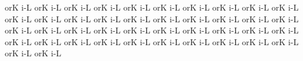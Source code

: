 


\initiumgregorianum
\spatium
{}or\punctum K\egn
\sgn {}i-\punctum L\egn
\spatium
{}or\punctum K\egn
\sgn {}i-\punctum L\egn
\spatium
{}or\punctum K\egn
\sgn {}i-\punctum L\egn
\spatium
{}or\punctum K\egn
\sgn {}i-\punctum L\egn
\spatium
{}or\punctum K\egn
\sgn {}i-\punctum L\egn
\spatium
{}or\punctum K\egn
\sgn {}i-\punctum L\egn
\spatium
{}or\punctum K\egn
\sgn {}i-\punctum L\egn
\spatium
{}or\punctum K\egn
\sgn {}i-\punctum L\egn
\spatium
{}or\punctum K\egn
\sgn {}i-\punctum L\egn
\spatium
{}or\punctum K\egn
\sgn {}i-\punctum L\egn
\spatium
{}or\punctum K\egn
\sgn {}i-\punctum L\egn
\spatium
{}or\punctum K\egn
\sgn {}i-\punctum L\egn
\spatium
{}or\punctum K\egn
\sgn {}i-\punctum L\egn
\spatium
{}or\punctum K\egn
\sgn {}i-\punctum L\egn
\spatium
{}or\punctum K\egn
\sgn {}i-\punctum L\egn
\spatium
{}or\punctum K\egn
\sgn {}i-\punctum L\egn
\spatium
{}or\punctum K\egn
\sgn {}i-\punctum L\egn
\spatium
{}or\punctum K\egn
\sgn {}i-\punctum L\egn
\spatium
\lineaproxima
{}or\punctum K\egn
\sgn {}i-\punctum L\egn
\spatium
{}or\punctum K\egn
\sgn {}i-\punctum L\egn
\spatium
{}or\punctum K\egn
\sgn {}i-\punctum L\egn
\spatium
{}or\punctum K\egn
\sgn {}i-\punctum L\egn
\spatium
{}or\punctum K\egn
\sgn {}i-\punctum L\egn
\spatium
{}or\punctum K\egn
\sgn {}i-\punctum L\egn
\spatium
{}or\punctum K\egn
\sgn {}i-\punctum L\egn
\spatium
{}or\punctum K\egn
\sgn {}i-\punctum L\egn
\spatium
{}or\punctum K\egn
\sgn {}i-\punctum L\egn
\spatium
{}or\punctum K\egn
\sgn {}i-\punctum L\egn
\spatium
{}or\punctum K\egn
\sgn {}i-\punctum L\egn
\spatium
{}or\punctum K\egn
\sgn {}i-\punctum L\egn
\spatium
{}or\punctum K\egn
\sgn {}i-\punctum L\egn
\spatium
{}or\punctum K\egn
\sgn {}i-\punctum L\egn
\spatium
{}or\punctum K\egn
\sgn {}i-\punctum L\egn
\spatium
{}or\punctum K\egn
\sgn {}i-\punctum L\egn
\spatium
{}or\punctum K\egn
\sgn {}i-\punctum L\egn
\spatium
{}or\punctum K\egn
\sgn {}i-\punctum L\egn
\spatium
\lineaproxima
{}or\punctum K\egn
\sgn {}i-\punctum L\egn
\spatium
{}or\punctum K\egn
\sgn {}i-\punctum L\egn
\spatium
{}or\punctum K\egn
\sgn {}i-\punctum L\egn
\spatium
{}or\punctum K\egn
\sgn {}i-\punctum L\egn
\spatium
{}or\punctum K\egn
\sgn {}i-\punctum L\egn
\spatium
{}or\punctum K\egn
\sgn {}i-\punctum L\egn
